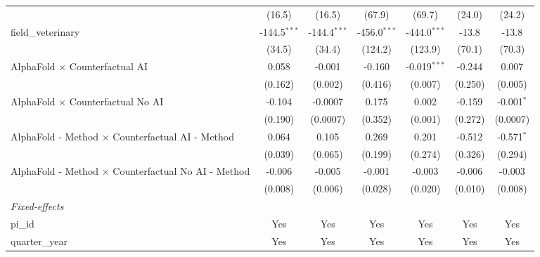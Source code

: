 \begin{tabular}{lcccccc}
                                                               & (16.5)         & (16.5)         & (67.9)         & (69.7)         & (24.0)        & (24.2)\\   
   field\_veterinary                                           & -144.5$^{***}$ & -144.4$^{***}$ & -456.0$^{***}$ & -444.0$^{***}$ & -13.8         & -13.8\\   
                                                               & (34.5)         & (34.4)         & (124.2)        & (123.9)        & (70.1)        & (70.3)\\   
   AlphaFold $\times$ Counterfactual AI                        & 0.058          & -0.001         & -0.160         & -0.019$^{***}$ & -0.244        & 0.007\\   
                                                               & (0.162)        & (0.002)        & (0.416)        & (0.007)        & (0.250)       & (0.005)\\   
   AlphaFold $\times$ Counterfactual No AI                     & -0.104         & -0.0007        & 0.175          & 0.002          & -0.159        & -0.001$^{*}$\\   
                                                               & (0.190)        & (0.0007)       & (0.352)        & (0.001)        & (0.272)       & (0.0007)\\   
   AlphaFold - Method $\times$ Counterfactual AI - Method      & 0.064          & 0.105          & 0.269          & 0.201          & -0.512        & -0.571$^{*}$\\   
                                                               & (0.039)        & (0.065)        & (0.199)        & (0.274)        & (0.326)       & (0.294)\\   
   AlphaFold - Method $\times$ Counterfactual No AI - Method   & -0.006         & -0.005         & -0.001         & -0.003         & -0.006        & -0.003\\   
                                                               & (0.008)        & (0.006)        & (0.028)        & (0.020)        & (0.010)       & (0.008)\\   
   \midrule
   \emph{Fixed-effects}\\
   pi\_id                                                      & Yes            & Yes            & Yes            & Yes            & Yes           & Yes\\  
   quarter\_year                                               & Yes            & Yes            & Yes            & Yes            & Yes           & Yes\\  

\end{tabular}
